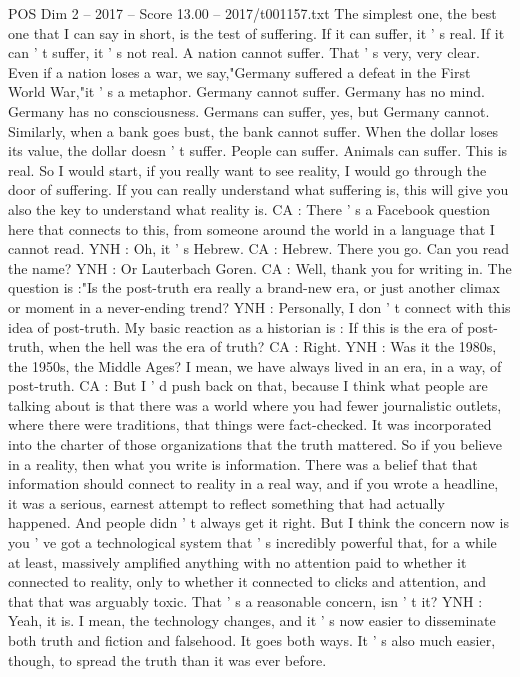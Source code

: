\begin{textsample}{POS Dim 2 – 2017 – Score 13.00 – 2017/t001157.txt}
The simplest one, the best one that I can say in short, is the test of suffering.
If it can suffer, it ' s real.
If it can ' t suffer, it ' s not real.
A nation cannot suffer.
That ' s very, very clear.
Even if a nation loses a war, we say,"Germany suffered a defeat in the First World War,"it ' s a metaphor.
Germany cannot suffer.
Germany has no mind.
Germany has no consciousness.
Germans can suffer, yes, but Germany cannot.
Similarly, when a bank goes bust, the bank cannot suffer.
When the dollar loses its value, the dollar doesn ' t suffer.
People can suffer.
Animals can suffer.
This is real.
So I would start, if you really want to see reality, I would go through the door of suffering.
If you can really understand what suffering is, this will give you also the key to understand what reality is.
CA : There ' s a Facebook question here that connects to this, from someone around the world in a language that I cannot read.
YNH : Oh, it ' s Hebrew.
CA : Hebrew.
There you go.
Can you read the name?
YNH : Or Lauterbach Goren.
CA : Well, thank you for writing in.
The question is :"Is the post-truth era really a brand-new era, or just another climax or moment in a never-ending trend?
YNH : Personally, I don ' t connect with this idea of post-truth.
My basic reaction as a historian is : If this is the era of post-truth, when the hell was the era of truth?
CA : Right.
YNH : Was it the 1980s, the 1950s, the Middle Ages?
I mean, we have always lived in an era, in a way, of post-truth.
CA : But I ' d push back on that, because I think what people are talking about is that there was a world where you had fewer journalistic outlets, where there were traditions, that things were fact-checked.
It was incorporated into the charter of those organizations that the truth mattered.
So if you believe in a reality, then what you write is information.
There was a belief that that information should connect to reality in a real way, and if you wrote a headline, it was a serious, earnest attempt to reflect something that had actually happened.
And people didn ' t always get it right.
But I think the concern now is you ' ve got a technological system that ' s incredibly powerful that, for a while at least, massively amplified anything with no attention paid to whether it connected to reality, only to whether it connected to clicks and attention, and that that was arguably toxic.
That ' s a reasonable concern, isn ' t it?
YNH : Yeah, it is.
I mean, the technology changes, and it ' s now easier to disseminate both truth and fiction and falsehood.
It goes both ways.
It ' s also much easier, though, to spread the truth than it was ever before.

\end{textsample}
